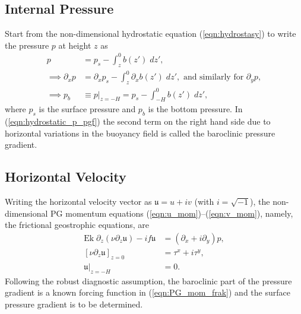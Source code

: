 \documentclass{ametsocV6.2}
\begin{document}
\subsection{Internal Pressure}
Start from the non-dimensional hydrostatic equation (\ref{eqn:hydrostasy}) to write the pressure $p$ at height $z$ as
\begin{align}
p & = p_s - \int_{z}^{0} b(z') \; dz' , \label{eqn:hydrostatic_p} \\
\implies \partial_x p & = \partial_x p_s - \int_{z}^{0} \partial_x b(z') \; dz' , \text{ and similarly for } \partial_y p ,\label{eqn:hydrostatic_p_pgf} \\
\implies p_b & \equiv p|_{z=-H} = p_s - \int_{-H}^{0} b(z') \; dz' , \label{eqn:pb} 
\end{align}
where $p_s$ is the surface pressure and $p_b$ is the bottom pressure.
In (\ref{eqn:hydrostatic_p_pgf}) the second term on the right hand side due to horizontal variations in the buoyancy field is called the baroclinic pressure gradient.

\subsection{Horizontal Velocity}
Writing the horizontal velocity vector as $\mathfrak{u} = u + i v$ (with $i = \sqrt{-1}$), the non-dimensional PG momentum equations (\ref{eqn:u_mom})--(\ref{eqn:v_mom}), namely, the frictional geostrophic equations, are
\begin{align}
\mathrm{Ek} \; \partial_z \left( \nu  \partial_z \mathfrak{u} \right)  - i f  \mathfrak{u} & =  \left( \partial_x + i \partial_y \right) p ,  \label{eqn:PG_mom_frak} \\
\left[ \nu  \partial_z \mathfrak{u} \right]_{z = 0} & = \tau^x + i \tau^y , \label{eqn:sfc_bcs_frak}
 \\
\mathfrak{u}|_{z = -H} & = 0 .
\label{eqn:bot_bcs_frak}
\end{align}
Following the robust diagnostic assumption, the baroclinic part of the pressure gradient is a known forcing function in (\ref{eqn:PG_mom_frak}) and the surface pressure gradient is to be determined.
\end{document}

